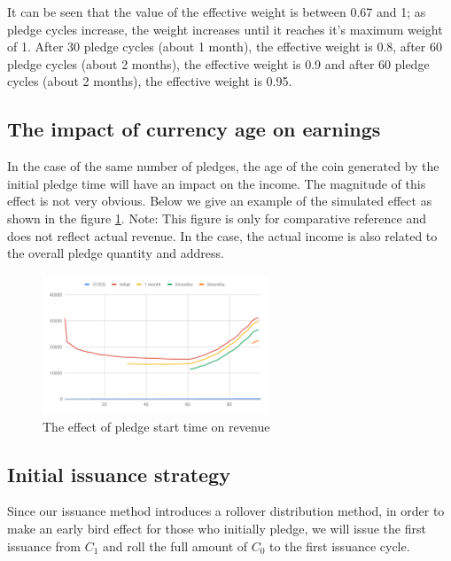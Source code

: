 It can be seen that the value of the effective weight is between 0.67 and 1; as pledge cycles increase, the weight increases until it reaches it's maximum weight of 1. After 30 pledge cycles (about 1 month), the effective weight is 0.8, after 60 pledge cycles (about 2 months), the effective weight is 0.9 and after 60 pledge cycles (about 2 months), the effective weight is 0.95.

\subsection{The impact of currency age on earnings}
In the case of the same number of pledges, the age of the coin generated by the initial pledge time will have an impact on the income. The magnitude of this effect is not very obvious. Below we give an example of the simulated effect as shown in the figure \ref{fig:compare}. Note: This figure is only for comparative reference and does not reflect actual revenue. In the case, the actual income is also related to the overall pledge quantity and address.
\begin{figure}[htbp]
  \centering
    \includegraphics[width=0.6\textwidth]{../common/zh/compare.pdf}
    \caption{The effect of pledge start time on revenue\label{fig:compare}}
\end{figure}

\subsection{Initial issuance strategy}
Since our issuance method introduces a rollover distribution method, in order to make an early bird effect for those who initially pledge, we will issue the first issuance from $C_1$ and roll the full amount of $C_0$ to the first issuance cycle.
